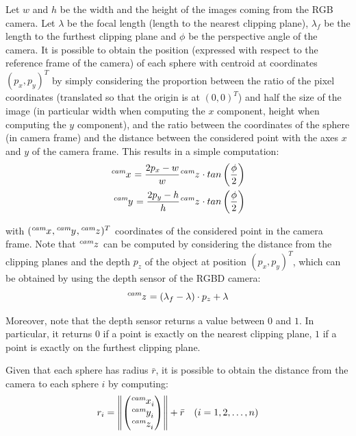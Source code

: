 \documentclass[a4paper]{article}
\newcommand\norm[1]{\left\lVert#1\right\rVert}
\begin{document}
Let $w$ and $h$ be the width and the
height of the images coming from the RGB camera. Let $\lambda$ be
the focal length (length to the nearest clipping
plane), $\lambda_f$ be the length to the furthest clipping plane and
$\phi$ be the perspective angle of the camera. It is possible
to obtain the position (expressed with respect to
the reference frame of the camera) of each sphere with centroid
at coordinates $(p_x, p_y)^T$ by simply considering the proportion
between the ratio of the pixel coordinates (translated so
that the origin is at $(0, 0)^T$) and half the size of the
image (in particular width when computing the $x$ component,
height when computing the $y$ component), and the ratio between
the coordinates of the sphere (in camera frame) and the distance
between the considered point with the axes $x$ and $y$ of the
camera frame. This results in a simple computation:
\begin{align}
    \tensor[^{cam}]{x}{} = \frac{2 p_x - w}{w} \tensor[^{cam}]{z}{} \cdot tan\left(\frac{\phi}{2}\right) \\
    \tensor[^{cam}]{y}{} = \frac{2 p_y - h}{h} \tensor[^{cam}]{z}{} \cdot tan\left(\frac{\phi}{2}\right)
\end{align}

\noindent with $(\tensor[^{cam}]{x}{}, \tensor[^{cam}]{y}{},
\tensor[^{cam}]{z}{})^T$ coordinates of the considered point
in the camera frame. Note that $\tensor[^{cam}]{z}{}$ can be
computed by
considering the distance from the clipping planes and the
depth $p_z$ of the object at position $(p_x, p_y)^T$, which can
be obtained by using the depth sensor of the RGBD camera:
\begin{equation}
    \tensor[^{cam}]{z}{} = (\lambda_f - \lambda) \cdot p_z + \lambda
\end{equation}

Moreover, note that the depth sensor returns a value between $0$ and $1$.
In particular, it returns $0$ if a point is exactly
on the nearest clipping plane, $1$ if a point is exactly on the
furthest clipping plane.

Given that each sphere has radius $\bar{r}$, it is possible to
obtain the distance from the camera to each sphere $i$ by computing:
\begin{equation}
    r_i =
    \norm{
        \begin{pmatrix}
            \tensor[^{cam}]{x}{_i} \\
            \tensor[^{cam}]{y}{_i} \\
            \tensor[^{cam}]{z}{_i}
        \end{pmatrix}
    } + \bar{r} \quad (i = 1, 2, \dots, n)
\end{equation}
\end{document}
